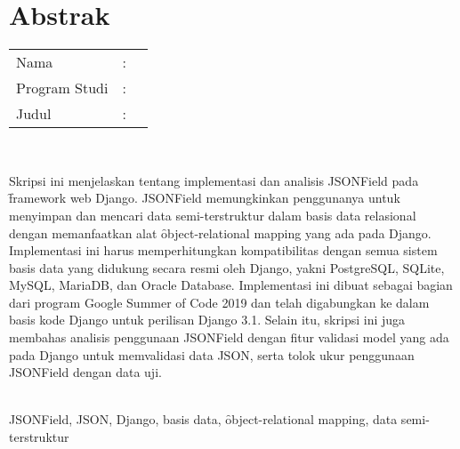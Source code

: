 %
%
%

\chapter*{Abstrak}
\singlespacing

\vspace*{0.2cm}

\noindent \begin{tabular}{l l p{10cm}}
	Nama&: & \penulis \\
	Program Studi&: & \programIndonesia \\
	Judul&: & \judulIndonesia \\
\end{tabular} \\

\vspace*{0.5cm}

\noindent
Skripsi ini menjelaskan tentang implementasi dan analisis JSONField pada
\f{framework} web Django. JSONField memungkinkan penggunanya untuk menyimpan
dan mencari data semi-terstruktur dalam basis data relasional dengan
memanfaatkan alat \f{object-relational mapping} yang ada pada Django.
Implementasi ini harus memperhitungkan kompatibilitas dengan semua sistem basis
data yang didukung secara resmi oleh Django, yakni PostgreSQL, SQLite, MySQL,
MariaDB, dan Oracle Database. Implementasi ini dibuat sebagai bagian dari
program Google Summer of Code 2019 dan telah digabungkan ke dalam basis kode
Django untuk perilisan Django 3.1. Selain itu, skripsi ini juga membahas
analisis penggunaan JSONField dengan fitur validasi model yang ada pada Django
untuk memvalidasi data JSON, serta tolok ukur penggunaan JSONField dengan data
uji. \\

\vspace*{0.2cm}

\noindent {} \\
JSONField, JSON, Django, basis data, \f{object-relational mapping}, data
semi-terstruktur \\

\onehalfspacing
\newpage
